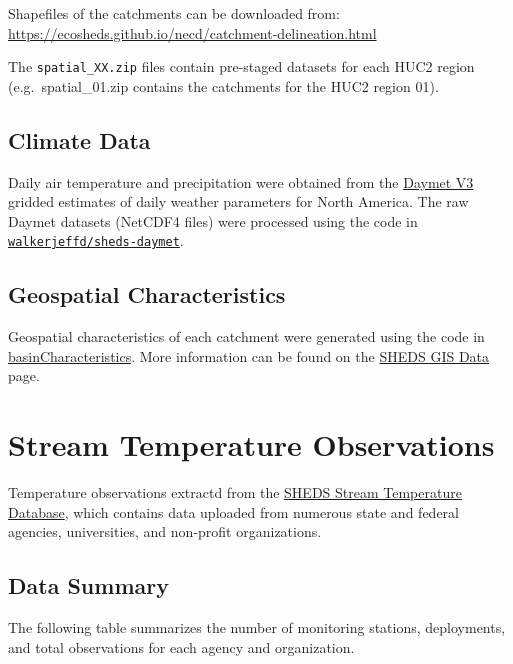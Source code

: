 \documentclass[
]{book}
\begin{document}
Shapefiles of the catchments can be downloaded from: \url{https://ecosheds.github.io/necd/catchment-delineation.html}

The \texttt{spatial\_XX.zip} files contain pre-staged datasets for each HUC2 region (e.g.~spatial\_01.zip contains the catchments for the HUC2 region 01).

\subsection{Climate Data}\label{climate-data}

Daily air temperature and precipitation were obtained from the \href{https://daymet.ornl.gov/}{Daymet V3} gridded estimates of daily weather parameters for North America. The raw Daymet datasets (NetCDF4 files) were processed using the code in \href{https://github.com/walkerjeffd/sheds-daymet}{\texttt{walkerjeffd/sheds-daymet}}.

\subsection{Geospatial Characteristics}\label{geospatial-characteristics}

Geospatial characteristics of each catchment were generated using the code in \href{https://github.com/Conte-Ecology/shedsGisData/tree/master/basinCharacteristics}{basinCharacteristics}. More information can be found on the \href{https://ecosheds.github.io/necd/}{SHEDS GIS Data} page.

\section{Stream Temperature Observations}\label{stream-temperature-observations}

Temperature observations extractd from the \href{http://db.ecosheds.org}{SHEDS Stream Temperature Database}, which contains data uploaded from numerous state and federal agencies, universities, and non-profit organizations.

\subsection{Data Summary}\label{data-summary}

The following table summarizes the number of monitoring stations, deployments, and total observations for each agency and organization.
\end{document}
